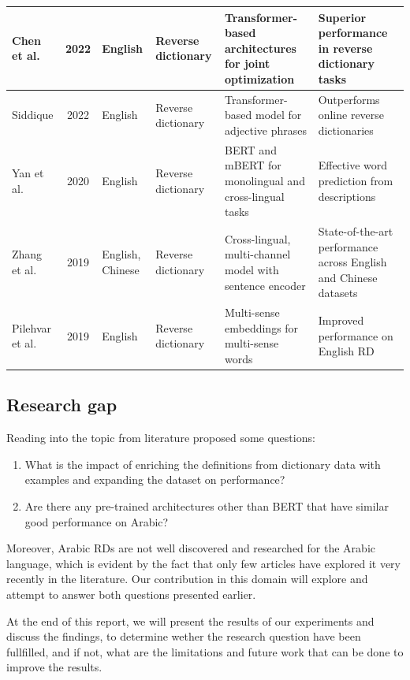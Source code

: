 \documentclass[12.5pt]{article}
\begin{document}
\begin{table}
\begin{tabularx}{\textwidth}{|l|c|L{0.4}|L{1}|L{1.4}|L{1.2}|}
        Chen et al. \cite{Chen2022} & 2022 & English & Reverse dictionary & Transformer-based architectures for joint optimization & Superior performance in reverse dictionary tasks \\
        \hline
        Siddique \cite{Siddique2022} & 2022 & English & Reverse dictionary & Transformer-based model for adjective phrases & Outperforms online reverse dictionaries \\
        \hline
        Yan et al. \cite{Yan2020} & 2020 & English & Reverse dictionary & BERT and mBERT for monolingual and cross-lingual tasks & Effective word prediction from descriptions \\
        \hline
        Zhang et al. \cite{Zhang2019} & 2019 & English, Chinese & Reverse dictionary & Cross-lingual, multi-channel model with sentence encoder & State-of-the-art performance across English and Chinese datasets \\
        \hline
        Pilehvar et al. \cite{Pilehvar2019} & 2019 & English & Reverse dictionary & Multi-sense embeddings for multi-sense words & Improved performance on English RD \\
        \hline
    \end{tabularx}
\end{table}

\subsection{Research gap}

Reading into the topic from literature proposed some questions:
\begin{enumerate}
    \item What is the impact of enriching the definitions from dictionary data with examples and expanding the dataset on performance?
    \item Are there any pre-trained architectures other than BERT that have similar good performance on Arabic?
\end{enumerate}

Moreover, Arabic RDs are not well discovered and researched for the Arabic language, which is evident by the fact that only few articles have explored it very recently in the literature. Our contribution in this domain will explore and attempt to answer both questions presented earlier.

At the end of this report, we will present the results of our experiments and discuss the findings, to determine wether the research question have been fullfilled, and if not, what are the limitations and future work that can be done to improve the results.
\end{document}
